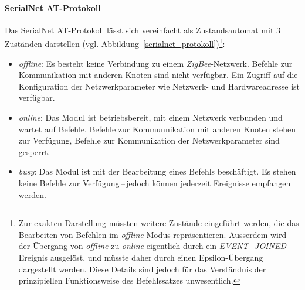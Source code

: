             \paragraph{SerialNet AT-Protokoll}


                Das SerialNet AT-Protokoll lässt sich vereinfacht als Zustandsautomat mit 3 Zuständen darstellen
                (vgl. Abbildung~\ref{serialnet_protokoll})\footnote{Zur exakten Darstellung müssten weitere 
                    Zustände eingeführt werden, die das Bearbeiten von Befehlen im \emph{offline}-Modus repräsentieren. 
                    Ausserdem wird der Übergang von \emph{offline} zu \emph{online} eigentlich durch ein 
                    \emph{EVENT\_JOINED}-Ereignis ausgelöst, und müsste daher durch einen Epsilon-Übergang dargestellt
                    werden. Diese Details sind jedoch für das Verständnis der prinzipiellen Funktionsweise des 
                    Befehlssatzes unwesentlich.}:

                \begin{itemize}
                    \item{\emph{offline}:} Es besteht keine Verbindung zu einem \emph{ZigBee}-Netzwerk. Befehle
                                    zur Kommunikation mit anderen Knoten sind nicht verfügbar. 
                                    Ein Zugriff auf die Konfiguration der Netzwerkparameter wie 
                                    Netzwerk- und Hardwareadresse ist verfügbar. 

                    \item{\emph{online}:} Das Modul ist betriebsbereit, mit einem Netzwerk verbunden und wartet
                                   auf Befehle. Befehle zur Kommunnikation mit anderen Knoten stehen zur
                                   Verfügung, Befehle zur Kommunikation der Netzwerkparameter sind gesperrt.

                    \item{\emph{busy}:} Das Modul ist mit der Bearbeitung eines Befehls beschäftigt. Es stehen
                                 keine Befehle zur Verfügung\,--\,jedoch können jederzeit Ereignisse 
                                 empfangen werden.
                \end{itemize}
                                    
